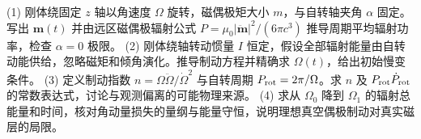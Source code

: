 (1) 刚体绕固定 \(z\) 轴以角速度 \(\Omega\) 旋转，磁偶极矩大小 \(m\)，与自转轴夹角 \(\alpha\) 固定。写出 \(\boldsymbol m(t)\) 并由远区磁偶极辐射公式 \(P=\mu_0|\ddot{\boldsymbol m}|^2/(6\pi c^3)\) 推导周期平均辐射功率，检查 \(\alpha=0\) 极限。
(2) 刚体绕轴转动惯量 \(I\) 恒定，假设全部辐射能量由自转动能供给，忽略磁矩和倾角演化。推导制动方程并精确求 \(\Omega(t)\)，给出初始慢变条件。
(3) 定义制动指数 \(n=\Omega\ddot\Omega/\dot\Omega^2\) 与自转周期 \(P_{\rm rot}=2\pi/\Omega\)。求 \(n\) 及 \(P_{\rm rot}\dot P_{\rm rot}\) 的常数表达式，讨论与观测偏离的可能物理来源。
(4) 求从 \(\Omega_0\) 降到 \(\Omega_1\) 的辐射总能量和时间，核对角动量损失的量纲与能量守恒，说明理想真空偶极制动对真实磁层的局限。
